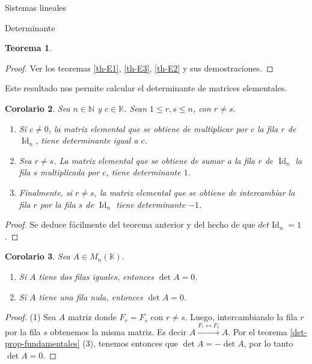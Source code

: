 \documentclass[a4paper,12pt,twoside,spanish,reqno]{amsbook}
\numberwithin{equation}{section}
\newtheorem{teorema}{Teorema}[section]
\newtheorem{corolario}[teorema]{Corolario}
\theoremstyle{definition}
\theoremstyle{remark}
\newcommand{\Id}{\operatorname{Id}}
\newcommand{\K}{\mathbb K}
\begin{document}
\begin{chapter}{Sistemas lineales}
\begin{section}{Determinante}
\begin{teorema}
\begin{enumerate}
        \end{enumerate}
    \end{teorema}
    \begin{proof}
        Ver  los teoremas \ref{th-E1}, \ref{th-E3}, \ref{th-E2} y  sus demostraciones.
    \end{proof}

    
    
    Este resultado nos permite calcular el determinante de matrices elementales.
    
    
    
    
    \begin{corolario}\label{det-mtrx-elem} Sea $n \in \mathbb N$ y $c \in \K$. Sean $1 \le r,s \le n$,  con $r \ne s$.
        \begin{enumerate}
            \item Si $c \not=0$, la matriz elemental que se obtiene de multiplicar por  $c$ la fila $r$ de $\Id_n$, tiene determinante igual a $c$.
            \item Sea $r \ne s$. La matriz elemental que se obtiene de sumar a la fila $r$ de $\Id_n$  la fila $s$ multiplicada por $c$, tiene determinante $1$.
            \item Finalmente, si $r \ne s$, la matriz elemental que se obtiene de intercambiar la fila $r$ por la fila $s$ de $\Id_n$ tiene determinante $-1$.
        \end{enumerate}	
    \end{corolario} 
    \begin{proof}
        Se deduce fácilmente del teorema anterior y del hecho de que $det \Id_n =1$.			
    \end{proof}
    
    
    \begin{corolario}\label{det-filas-iguales} Sea $A  \in M_n(\K)$.
        \begin{enumerate}
            \item Si $A$ tiene dos filas iguales,  entonces $\det A=0$.
            \item Si $A$ tiene una fila nula, entonces $\det A =0$.
        \end{enumerate}
    \end{corolario}
    \begin{proof}
        (1) Sea $A$ matriz donde $F_r = F_s$ con $r\ne s$. Luego, intercambiando la fila $r$ por la fila $s$ obtenemos la misma matriz. Es decir $A  \stackrel{F_r \leftrightarrow F_s}{\longrightarrow} A$. Por el teorema \ref{det-prop-fundamentales} (3), tenemos entonces que $\det A = - \det A$, por lo tanto  $\det A =0$. 
        

\end{proof}
\end{section}
\end{chapter}
\end{document}
